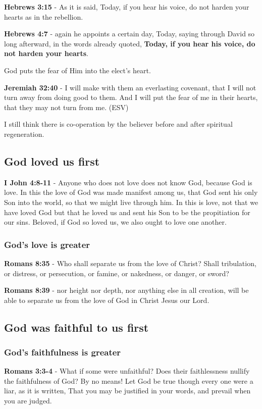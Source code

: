 \documentclass[11pt]{article}
\begin{document}
\textbf{Hebrews 3:15} - As it is said, Today, if you hear his voice, do not harden your hearts as in the rebellion.

\textbf{Hebrews 4:7} - again he appoints a certain day, Today, saying through David so long afterward, in the words already quoted, \textbf{Today, if you hear his voice, do not harden your hearts}.

God puts the fear of Him into the elect's heart.

\textbf{Jeremiah 32:40} - I will make with them an everlasting covenant, that I will not turn away from doing good to them. And I will put the fear of me in their hearts, that they may not turn from me. (ESV)

I still think there is co-operation by the believer before and after spiritual regeneration.

\subsection{God loved us first}
\label{sec:org1c9672f}
\textbf{I John 4:8-11} - Anyone who does not love does not know God, because God is love. In this the love of God was made manifest among us, that God sent his only Son into the world, so that we might live through him. In this is love, not that we have loved God but that he loved us and sent his Son to be the propitiation for our sins. Beloved, if God so loved us, we also ought to love one another.

\subsubsection{God's love is greater}
\label{sec:orgb379f55}
\textbf{Romans 8:35} - Who shall separate us from the love of Christ? Shall tribulation, or distress, or persecution, or famine, or nakedness, or danger, or sword?

\textbf{Romans 8:39} - nor height nor depth, nor anything else in all creation, will be able to separate us from the love of God in Christ Jesus our Lord.

\subsection{God was faithful to us first}
\label{sec:orgaf7bd5a}
\subsubsection{God's faithfulness is greater}
\label{sec:org70177a2}
\textbf{Romans 3:3-4} - What if some were unfaithful? Does their faithlessness nullify the faithfulness of God? By no means! Let God be true though every one were a liar, as it is written, That you may be justified in your words, and prevail when you are judged.
\end{document}
